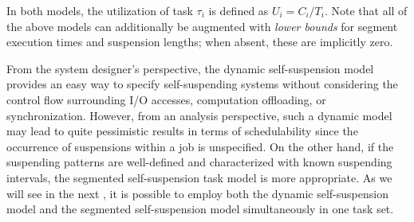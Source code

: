 In both models, the
utilization of task $\tau_i$ is defined as $U_i=C_i/T_i$.
Note that all of the above models can additionally be augmented with \emph{lower bounds} for segment execution times and suspension 
lengths; when absent, these are implicitly zero.

From the system designer's perspective, the dynamic self-suspension model provides an easy way to specify self-suspending systems 
without considering the control flow surrounding I/O accesses, computation offloading, or synchronization. However, from an analysis perspective, such a 
dynamic model may lead to quite pessimistic results in terms of schedulability since the occurrence of suspensions within a job is 
unspecified. On the other hand, if the suspending patterns are well-defined and characterized with known suspending intervals, the 
segmented self-suspension task model is more appropriate.   
As we will see in the next \mysectionrefnormal{}, it is possible to employ both the dynamic self-suspension model and the segmented self-suspension model simultaneously 
in one task set.




